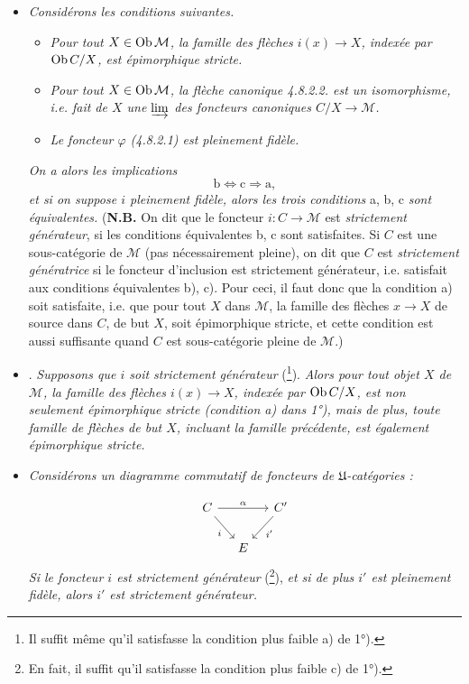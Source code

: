 \begin{itemize}[label={}]
\item[\textit{1°)}] \textit{Considérons les conditions suivantes.}
\begin{itemize}[label={}]
\item[\circled{a}] \textit{Pour tout $X \in \operatorname{Ob} \mathcal{M}$, la famille des flèches $i(x) \longrightarrow X$, indexée par $\operatorname{Ob} C/X$, est épimorphique stricte.}

\item[\circled{b}] \textit{Pour tout $X \in \operatorname{Ob} \mathcal{M}$, la flèche canonique 4.8.2.2. est un isomorphisme, i.e. fait de $X$ une $\varinjlim$ des foncteurs canoniques $C/X \longrightarrow \mathcal{M}$.}
\item[\circled{c}] \textit{Le foncteur $\varphi$ (4.8.2.1) est pleinement fidèle.}
\end{itemize}
\textit{On a alors les implications}
\[ \mathrm{b} \Longleftrightarrow \mathrm{c} \Longrightarrow \mathrm{a} , \]
\textit{et si on suppose $i$ pleinement fidèle, alors les trois conditions} a, b, c \textit{sont équivalentes.} (\textbf{N.B.} On dit que le foncteur $i : C \longrightarrow \mathcal{M}$ est \textit{strictement générateur}, si les conditions équivalentes b, c sont satisfaites. Si $C$ est une sous-catégorie de $\mathcal{M}$ (pas
nécessairement pleine), on dit que $C$ est \textit{strictement génératrice} si le foncteur d'inclusion est strictement générateur, i.e. satisfait aux conditions équivalentes b), c). Pour ceci, il faut donc que la condition a) soit satisfaite, i.e. que pour tout $X$ dans $\mathcal{M}$, la famille des flèches $x \longrightarrow X$ de source dans $C$, de but $X$, soit épimorphique stricte, et cette condition est aussi suffisante quand $C$ est sous-catégorie pleine de $\mathcal{M}$.)
\item[\textit{2°)}] . \textit{Supposons que $i$ soit strictement générateur} (\footnote[81]{Il suffit même qu'il satisfasse la condition plus faible a) de 1°).}). \textit{Alors pour tout objet $X$ de $\mathcal{M}$, la famille des flèches $i(x) \longrightarrow X$, indexée par $\operatorname{Ob} C/X$, est non seulement épimorphique stricte (condition a) dans 1°), mais de plus, toute famille de flèches de but $X$, incluant la famille précédente, est également épimorphique stricte.}
\item[\textit{3°)}] \textit{Considérons un diagramme commutatif de foncteurs de $\mathfrak{U}$-catégories :}

\[ \begin{tikzcd}[column sep=small]
C \arrow[rr, "\alpha"] \arrow[dr, "i"'] & & C' \arrow[dl, "i'"] \\
& E &
\end{tikzcd} \]
\textit{Si le foncteur $i$ est strictement générateur} (\footnote[82]{En fait, il suffit qu'il satisfasse la condition plus faible c) de 1°).}), \textit{et si de plus $i'$ est pleinement fidèle, alors $i'$ est strictement générateur.}
\end{itemize}

